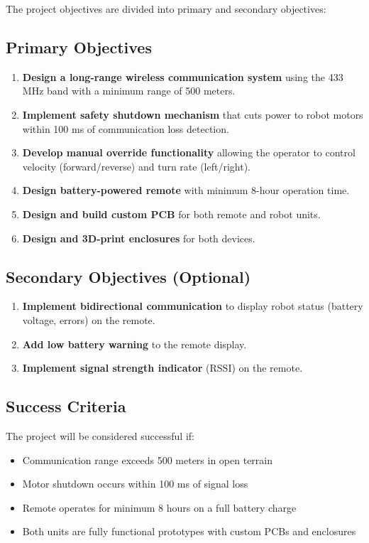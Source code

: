 The project objectives are divided into primary and secondary objectives:

\subsection*{Primary Objectives}
\begin{enumerate}
    \item \textbf{Design a long-range wireless communication system} using the 433 MHz band with a minimum range of 500 meters.
    
    \item \textbf{Implement safety shutdown mechanism} that cuts power to robot motors within 100 ms of communication loss detection.
    
    \item \textbf{Develop manual override functionality} allowing the operator to control velocity (forward/reverse) and turn rate (left/right).
    
    \item \textbf{Design battery-powered remote} with minimum 8-hour operation time.
    
    \item \textbf{Design and build custom PCB} for both remote and robot units.
    
    \item \textbf{Design and 3D-print enclosures} for both devices.
\end{enumerate}

\subsection*{Secondary Objectives (Optional)}
\begin{enumerate}
    \item \textbf{Implement bidirectional communication} to display robot status (battery voltage, errors) on the remote.
    
    \item \textbf{Add low battery warning} to the remote display.
    
    \item \textbf{Implement signal strength indicator} (RSSI) on the remote.
\end{enumerate}

\subsection*{Success Criteria}
The project will be considered successful if:
\begin{itemize}
    \item Communication range exceeds 500 meters in open terrain
    \item Motor shutdown occurs within 100 ms of signal loss
    \item Remote operates for minimum 8 hours on a full battery charge
    \item Both units are fully functional prototypes with custom PCBs and enclosures
\end{itemize}
